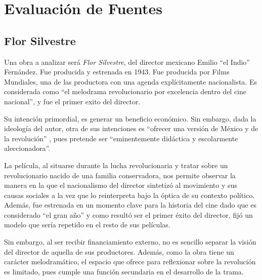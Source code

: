 \section{Evaluación de Fuentes}
\subsection{Flor Silvestre}
Una obra a analizar será \textit{Flor Silvestre}, del director mexicano Emilio ``el Indio'' Fernández. 
Fue producida y estrenada en 1943\autocite[17]{garcia_riera_historia_1992}.
Fue producida por Films Mundiales\autocite[17]{garcia_riera_historia_1992}, una de las productora con una agenda explícitamente nacionalista.\autocite[10]{garcia_riera_historia_1992} 
Es considerada como ``el melodrama revolucionario por excelencia dentro del cine
nacional''\autocite[178]{guerrero_imagen_2005},
y fue el  primer exito del director\autocite[19]{costa_cine_2010}.

Su intención primordial, es generar un beneficio económico.
Sin embargo, dada la ideología del autor, otra de sus intenciones es ``ofrecer una versión de México y de la revolución''%
, pues pretende ser ``eminentemente didáctica y escolarmente aleccionadora''\autocite[28]{blanco_aventura_1993}.

La película, al situarse durante la lucha revolucionaria y tratar sobre un revolucionario nacido de una familia conservadora, nos permite observar la manera en la que el nacionalismo del director sintetizó al movimiento y sus causas sociales a la vez que lo reinterpreta bajo la óptica de su contexto político. Además, fue estrenada en un momento clave para la historia del cine dado que es considerado ``el gran año''\autocite[7]{garcia_riera_historia_1992} y como resultó ser el primer éxito del director, fijó un modelo que sería repetido en el resto de sus películas\autocite[86]{demello_unfinished_2001}.

Sin embargo, al ser recibir financiamiento externo, no es sencillo separar la visión del director de aquella de sus productores. 
Además, como la obra tiene un carácter melodramático, el espacio que ofrece para reflexionar sobre la revolución es limitado, pues cumple una función secundaria en el desarrollo de la trama.\autocite[365]{sanchez_vi._2010}



